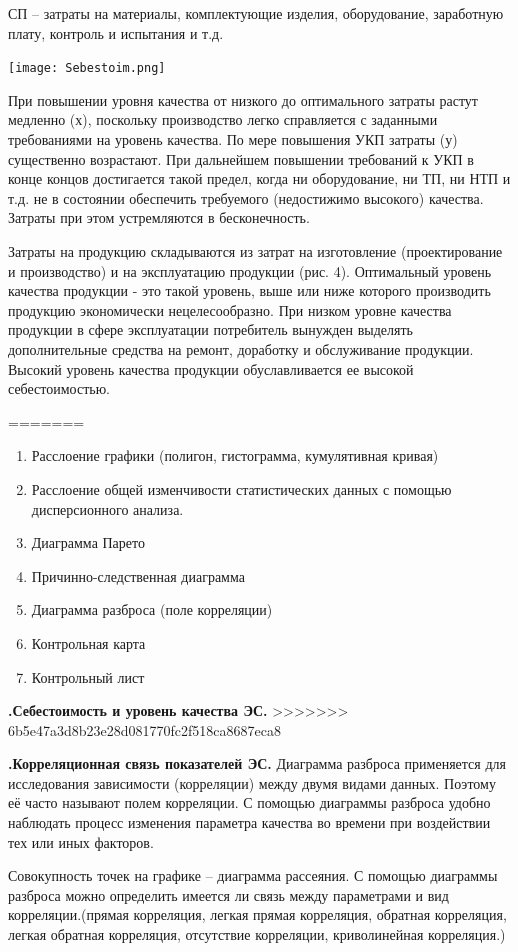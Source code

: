 \documentclass[unicode, 12pt, a4paper, oneside]{article}
\newcounter{qcnt}
\newcommand{\quest}[1]{\par\refstepcounter{qcnt}\textbf{\arabic{qcnt}.\quad #1}}
\begin{document}
СП – затраты на материалы, комплектующие  изделия, оборудование, заработную плату, контроль и испытания и т.д. 
 \begin{center} 
 \texttt{[image: Sebestoim.png]}\\
 \end{center}
При повышении уровня качества от низкого до оптимального затраты растут медленно (х), поскольку производство легко справляется с заданными требованиями на уровень качества. По мере повышения УКП затраты (у) существенно возрастают. При дальнейшем повышении требований к УКП в конце концов достигается такой предел, когда ни оборудование, ни ТП, ни НТП и т.д. не в состоянии обеспечить требуемого (недостижимо высокого) качества. Затраты при этом устремляются в бесконечность.

Затраты на продукцию складываются из затрат на изготовление (проектирование и производство) и на эксплуатацию продукции (рис. 4).
Оптимальный уровень качества продукции - это такой уровень, выше или ниже которого производить продукцию экономически нецелесообразно.
При низком уровне качества продукции в сфере эксплуатации потребитель вынужден выделять дополнительные средства на ремонт, доработку и обслуживание продукции.
Высокий уровень качества продукции обуславливается ее высокой себестоимостью. 

=======
\begin{enumerate}
\item Расслоение графики (полигон, гистограмма, кумулятивная кривая)
\item Расслоение общей изменчивости статистических данных с помощью дисперсионного анализа.
\item Диаграмма Парето
\item Причинно-следственная диаграмма
\item Диаграмма разброса (поле корреляции)
\item Контрольная карта
\item Контрольный лист
\end{enumerate}

\quest{Себестоимость и уровень качества ЭС.}
>>>>>>> 6b5e47a3d8b23e28d081770fc2f518ca8687eca8
\quest{Корреляционная связь показателей ЭС.}
Диаграмма разброса применяется для исследования зависимости (корреляции) между двумя видами данных. Поэтому её часто называют полем корреляции.
С помощью диаграммы разброса удобно наблюдать процесс изменения параметра качества во времени при воздействии тех или иных факторов.

Совокупность точек на графике – диаграмма рассеяния.
С помощью диаграммы разброса можно определить имеется ли связь между параметрами и вид корреляции.(прямая корреляция, легкая прямая корреляция, обратная корреляция, легкая обратная корреляция, отсутствие корреляции, криволинейная корреляция.)
\end{document}
